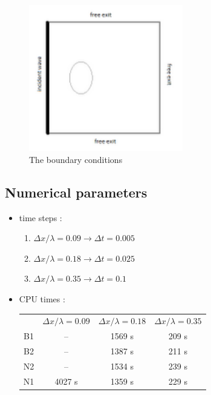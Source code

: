 \begin{figure}[h!]
  \centering
    \includegraphics[width=0.6\textwidth]{boundary_limit.png}
      \caption{The boundary conditions}
\end{figure}

\subsection{Numerical parameters}
\begin{itemize}
\item time steps :
	\begin{enumerate}
    \item $\Delta x / \lambda = 0.09  \rightarrow \Delta t = 0.005 $
    \item $\Delta x / \lambda = 0.18  \rightarrow \Delta t = 0.025 $
    \item $\Delta x / \lambda = 0.35  \rightarrow \Delta t = 0.1 $
  \end{enumerate}
\item CPU times : \\
\begin{tabular}{cccc}
 & $\Delta x / \lambda = 0.09 $ &$\Delta x / \lambda = 0.18 $&$\Delta x / \lambda = 0.35 $\\
 B1 & -- & 1569 s & 209 s \\
 B2 & -- & 1387 s & 211 s \\
 N2 & -- & 1534 s & 239 s \\
 N1 & 4027 s & 1359 s & 229 s\\

\end{tabular}
\end{itemize}

